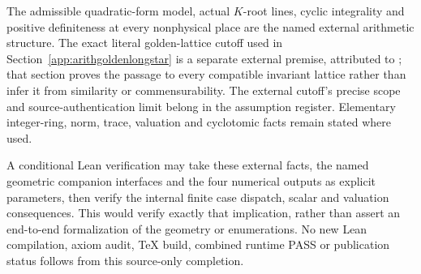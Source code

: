 The admissible quadratic-form
model, actual \(K\)-root lines,
cyclic integrality and positive
definiteness at every nonphysical
place are the named external
arithmetic structure.
The exact literal golden-lattice
cutoff used in
Section~\ref{app:arithgoldenlongstar}
is a separate external premise,
attributed to
\cite{BugaenkoGolden1984};
that section proves the passage
to every compatible invariant
lattice rather than infer it
from similarity or commensurability.
The external cutoff's precise
scope and source-authentication
limit belong in the assumption
register.
Elementary integer-ring, norm,
trace, valuation and cyclotomic
facts remain stated where used.

A conditional Lean verification
may take these external facts,
the named geometric companion
interfaces and the four numerical
outputs as explicit parameters,
then verify the internal finite
case dispatch, scalar and valuation
consequences.
This would verify exactly that
implication, rather than assert
an end-to-end formalization of
the geometry or enumerations.
No new Lean compilation, axiom
audit, TeX build, combined runtime
PASS or publication status follows
from this source-only completion.




















































